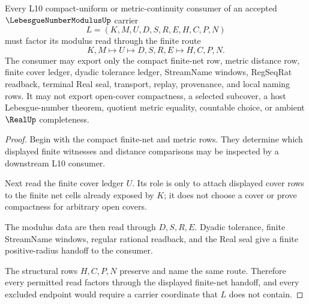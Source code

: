 \begin{theorem}
\label{thm:lebesgue-number-modulus-finite-net-handoff}
Every L10 compact-uniform or metric-continuity consumer of an accepted $\LebesgueNumberModulusUp$ carrier
$$
L=(K,M,U,D,S,R,E,H,C,P,N)
$$
must factor its modulus read through the finite route
$$
K,M \longmapsto U \longmapsto D,S,R,E \longmapsto H,C,P,N .
$$
The consumer may export only the compact finite-net row, metric distance row, finite cover ledger, dyadic tolerance ledger, StreamName windows, RegSeqRat readback, terminal Real seal, transport, replay, provenance, and local naming rows. It may not export open-cover compactness, a selected subcover, a host Lebesgue-number theorem, quotient metric equality, countable choice, or ambient $\RealUp$ completeness.
\end{theorem}
\begin{proof}
Begin with the compact finite-net and metric rows. They determine which displayed finite witnesses and distance comparisons may be inspected by a downstream L10 consumer.

Next read the finite cover ledger $U$. Its role is only to attach displayed cover rows to the finite net cells already exposed by $K$; it does not choose a cover or prove compactness for arbitrary open covers.

The modulus data are then read through $D,S,R,E$. Dyadic tolerance, finite StreamName windows, regular rational readback, and the Real seal give a finite positive-radius handoff to the consumer.

The structural rows $H,C,P,N$ preserve and name the same route. Therefore every permitted read factors through the displayed finite-net handoff, and every excluded endpoint would require a carrier coordinate that $L$ does not contain.
\end{proof}




